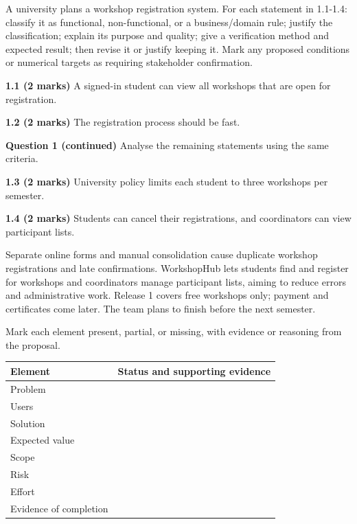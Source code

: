 A university plans a workshop registration system. For each statement in 1.1-1.4: classify it as functional, non-functional, or a business/domain rule; justify the classification; explain its purpose and quality; give a verification method and expected result; then revise it or justify keeping it. Mark any proposed conditions or numerical targets as requiring stakeholder confirmation.\par
\textbf{1.1 (2 marks)} A signed-in student can view all workshops that are open for registration.\par
\blankbox{6.5cm}
\textbf{1.2 (2 marks)} The registration process should be fast.\par
\blankbox{6.5cm}
\newpage
\textbf{Question 1 (continued)} Analyse the remaining statements using the same criteria.\par
\textbf{1.3 (2 marks)} University policy limits each student to three workshops per semester.\par
\blankbox{7.5cm}
\textbf{1.4 (2 marks)} Students can cancel their registrations, and coordinators can view participant lists.\par
\blankbox{7.5cm}
\newpage
{}
Separate online forms and manual consolidation cause duplicate workshop registrations and late confirmations. WorkshopHub lets students find and register for workshops and coordinators manage participant lists, aiming to reduce errors and administrative work. Release 1 covers free workshops only; payment and certificates come later. The team plans to finish before the next semester.\par
{}
Mark each element present, partial, or missing, with evidence or reasoning from the proposal.\par
\begingroup
\renewcommand{\tabularxcolumn}[1]{m{#1}}
\begin{tabularx}{\linewidth}{|>{\raggedright\arraybackslash}m{4cm}|Y|}\hline
Element & Status and supporting evidence\\\hline
Problem & \rule{0pt}{.9cm}\\\hline
Users & \rule{0pt}{.9cm}\\\hline
Solution & \rule{0pt}{.9cm}\\\hline
Expected value & \rule{0pt}{.9cm}\\\hline
Scope & \rule{0pt}{.9cm}\\\hline
Risk & \rule{0pt}{.9cm}\\\hline
Effort & \rule{0pt}{.9cm}\\\hline
Evidence of completion & \rule{0pt}{.9cm}\\\hline
\end{tabularx}

